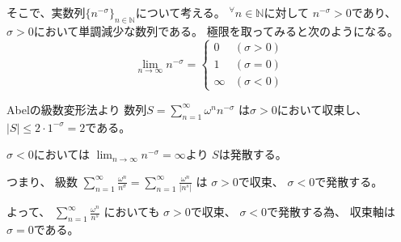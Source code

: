 \documentclass[12pt,b5paper]{ltjsarticle}
\begin{document}
そこで、実数列$\{n^{-\sigma}\}_{n\in\mathbb{N}}$について考える。
${}^{\forall}n\in\mathbb{N}$に対して
$n^{-\sigma}>0$であり、
$\sigma>0$において単調減少な数列である。
極限を取ってみると次のようになる。
\begin{equation}
 \lim_{n\to\infty}n^{-\sigma}=
  \begin{cases}
   0 & (\sigma>0)\\
   1 & (\sigma=0)\\
   \infty & (\sigma < 0)
  \end{cases}
\end{equation}

Abelの級数変形法より
数列$S=\sum_{n=1}^{\infty}\omega^{n}n^{-\sigma}$
は$\sigma>0$において収束し、
$\lvert S \rvert \leq 2\cdot 1^{-\sigma}=2$である。

$\sigma<0$においては
$\lim_{n\to\infty}n^{-\sigma}=\infty$より
$S$は発散する。

つまり、
級数
$\sum_{n=1}^{\infty}\frac{\omega^n}{n^\sigma}=\sum_{n=1}^{\infty}\frac{\omega^n}{\lvert n^{s} \rvert}$
は
$\sigma>0$で収束、
$\sigma<0$で発散する。

よって、
$\sum_{n=1}^{\infty}\frac{\omega^n}{n^{s}}$
においても
$\sigma>0$で収束、
$\sigma<0$で発散する為、
収束軸は$\sigma=0$である。


%
%
%


\hrulefill
\end{document}
